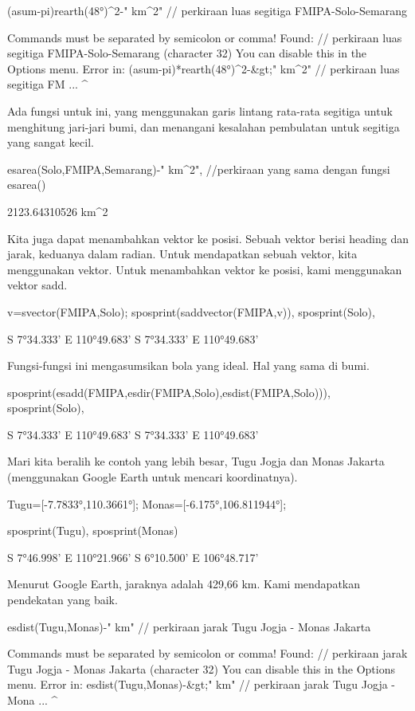 \documentclass{article}
\begin{document}
\>(asum-pi)\*rearth(48°)^2-\>" km^2" // perkiraan luas segitiga FMIPA-Solo-Semarang


    Commands must be separated by semicolon or comma!
    Found:  // perkiraan luas segitiga FMIPA-Solo-Semarang (character 32)
    You can disable this in the Options menu.
    Error in:
    (asum-pi)*rearth(48°)^2-&gt;" km^2" // perkiraan luas segitiga FM ...
                                    ^

Ada fungsi untuk ini, yang menggunakan garis lintang rata-rata
segitiga untuk menghitung jari-jari bumi, dan menangani kesalahan
pembulatan untuk segitiga yang sangat kecil.


\>esarea(Solo,FMIPA,Semarang)-\>" km^2", //perkiraan yang sama dengan fungsi esarea()


    2123.64310526 km^2

Kita juga dapat menambahkan vektor ke posisi. Sebuah vektor berisi
heading dan jarak, keduanya dalam radian. Untuk mendapatkan sebuah
vektor, kita menggunakan vektor. Untuk menambahkan vektor ke posisi,
kami menggunakan vektor sadd.


\>v=svector(FMIPA,Solo); sposprint(saddvector(FMIPA,v)), sposprint(Solo),


    S 7°34.333' E 110°49.683'
    S 7°34.333' E 110°49.683'

Fungsi-fungsi ini mengasumsikan bola yang ideal. Hal yang sama di
bumi.


\>sposprint(esadd(FMIPA,esdir(FMIPA,Solo),esdist(FMIPA,Solo))), sposprint(Solo),


    S 7°34.333' E 110°49.683'
    S 7°34.333' E 110°49.683'

Mari kita beralih ke contoh yang lebih besar, Tugu Jogja dan Monas
Jakarta (menggunakan Google Earth untuk mencari koordinatnya).


\>Tugu=[-7.7833°,110.3661°]; Monas=[-6.175°,106.811944°];

\>sposprint(Tugu), sposprint(Monas)


    S 7°46.998' E 110°21.966'
    S 6°10.500' E 106°48.717'

Menurut Google Earth, jaraknya adalah 429,66 km. Kami mendapatkan
pendekatan yang baik.


\>esdist(Tugu,Monas)-\>" km" // perkiraan jarak Tugu Jogja - Monas Jakarta


    Commands must be separated by semicolon or comma!
    Found:  // perkiraan jarak Tugu Jogja - Monas Jakarta (character 32)
    You can disable this in the Options menu.
    Error in:
    esdist(Tugu,Monas)-&gt;" km" // perkiraan jarak Tugu Jogja - Mona ...
                             ^
\end{document}
